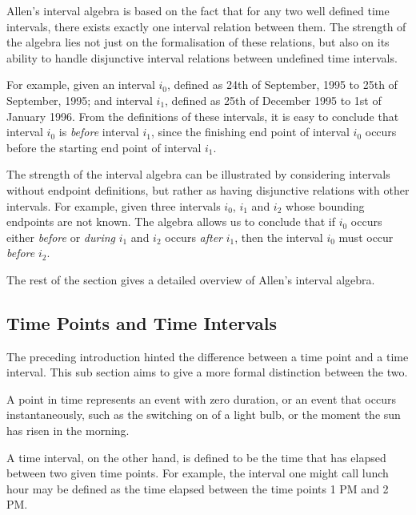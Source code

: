 \documentclass[11pt]{report}
\begin{document}
      Allen's interval algebra \cite{ALE} is based on the fact that for any
      two well defined time intervals, there exists exactly one interval
      relation between them. The strength of the algebra lies not just on
      the formalisation of these relations, but also on its ability to handle
      disjunctive interval relations between undefined time intervals.

      For example, given an interval ${i_0}$, defined as 24th of September,
      1995 to 25th of September, 1995; and interval ${i_1}$, defined as 25th of
      December 1995 to 1st of January 1996. From the definitions of these
      intervals, it is easy to conclude that interval ${i_0}$ is {\em before}
      interval ${i_1}$, since the finishing end point of interval ${i_0}$
      occurs before the starting end point of interval ${i_1}$.

      The strength of the interval algebra can be illustrated by considering
      intervals without endpoint definitions, but rather as having disjunctive
      relations with other intervals. For example, given three intervals
      ${i_0}$, ${i_1}$ and ${i_2}$ whose bounding endpoints are not known. The
      algebra allows us to conclude that if ${i_0}$ occurs either {\em before}
      or {\em during} ${i_1}$ and ${i_2}$ occurs {\em after} ${i_1}$, then the
      interval ${i_0}$ must occur {\em before} ${i_2}$.

      The rest of the section gives a detailed overview of Allen's interval
      algebra.

      \subsection{Time Points and Time Intervals}
        \label{subs-tempo-tpint}

        The preceding introduction hinted the difference between a time point and a
        time interval. This sub section aims to give a more formal distinction between
        the two.

        A point in time represents an event with zero duration, or an event that occurs
        instantaneously, such as the switching on of a light bulb, or the moment the sun
        has risen in the morning.

        A time interval, on the other hand, is defined to be the time that has elapsed
        between two given time points. For example, the interval one might call lunch
        hour may be defined as the time elapsed between the time points 1 PM and 2 PM.
\end{document}
